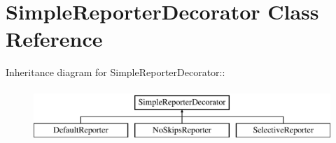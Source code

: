 \hypertarget{class_simple_reporter_decorator}{
\section{SimpleReporterDecorator Class Reference}
\label{class_simple_reporter_decorator}
}
Inheritance diagram for SimpleReporterDecorator::\begin{figure}[H]
\begin{center}
\leavevmode
\includegraphics[height=2cm]{class_simple_reporter_decorator}
\end{center}
\end{figure}
